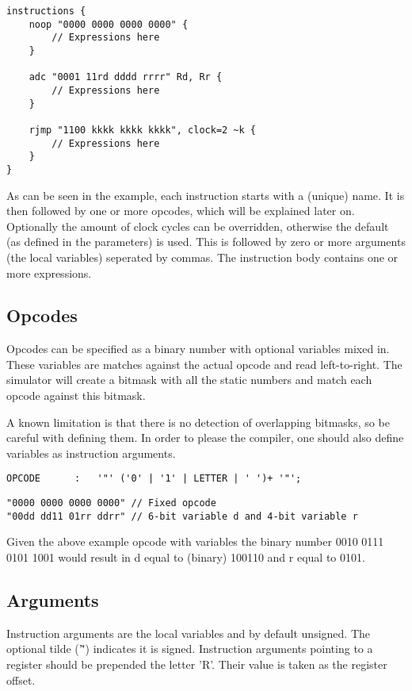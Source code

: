 \lstset{caption=Example instructions}
\begin{lstlisting}
instructions {
	noop "0000 0000 0000 0000" {
		// Expressions here
	}

	adc "0001 11rd dddd rrrr" Rd, Rr {
		// Expressions here
	}

	rjmp "1100 kkkk kkkk kkkk", clock=2 ~k {
		// Expressions here
	}
}
\end{lstlisting}

As can be seen in the example, each instruction starts with a (unique) name. It
is then followed by one or more opcodes, which will be explained later on.
Optionally the amount of clock cycles can be overridden, otherwise the default
(as defined in the parameters) is used. This is followed by zero or more
arguments (the local variables) seperated by commas. The instruction body
contains one or more expressions.

\subsection{Opcodes}
Opcodes can be specified as a binary number with optional variables mixed in.
These variables are matches against the actual opcode and read left-to-right. 
The simulator will create a bitmask with all the static numbers and match each
opcode against this bitmask.

A known limitation is that there is no detection of overlapping bitmasks, so be
careful with defining them. In order to please the compiler, one should also
define variables as instruction arguments.

\lstset{caption=Opcode specifation}
\begin{lstlisting}
OPCODE		:	'"' ('0' | '1' | LETTER | ' ')+ '"';
\end{lstlisting}

\lstset{caption=Example opcodes}
\begin{lstlisting}
"0000 0000 0000 0000" // Fixed opcode
"00dd dd11 01rr ddrr" // 6-bit variable d and 4-bit variable r
\end{lstlisting}

Given the above example opcode with variables the binary number 0010 0111 0101
1001 would result in d equal to (binary) 100110 and r equal to 0101.

\subsection{Arguments}
Instruction arguments are the local variables and by default unsigned. The
optional tilde ('\~') indicates it is signed. Instruction arguments pointing to
a register should be prepended the letter 'R'. Their value is taken as the
register offset.

